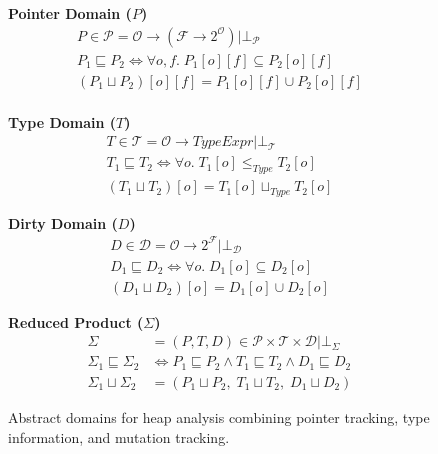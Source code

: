 
\begin{figure*}[t]
\centering

\begin{minipage}[t]{0.32\textwidth}
\centering
\textbf{Pointer Domain ($P$)}
\begin{gather*}
P \in \mathcal{P} = \mathcal{O} \to (\mathcal{F} \to 2^{\mathcal{O}}) | \bot_\mathcal{P} \\[0.3em]
P_1 \sqsubseteq P_2 \iff \forall o,f.\; P_1[o][f] \subseteq P_2[o][f] \\[0.3em]
(P_1 \sqcup P_2)[o][f] = P_1[o][f] \cup P_2[o][f] \\
\end{gather*}
\end{minipage}%
\hfill
\begin{minipage}[t]{0.32\textwidth}
\centering
\textbf{Type Domain ($T$)}
\begin{gather*}
T \in \mathcal{T} = \mathcal{O} \to \mathit{TypeExpr} | \bot_\mathcal{T} \\[0.3em]
T_1 \sqsubseteq T_2 \iff \forall o.\; T_1[o] \leq_{\mathit{Type}} T_2[o] \\[0.3em]
(T_1 \sqcup T_2)[o] = T_1[o] \sqcup_{\mathit{Type}} T_2[o]
\end{gather*}
\end{minipage}%
\hfill
\begin{minipage}[t]{0.32\textwidth}
\centering
\textbf{Dirty Domain ($D$)}
\begin{gather*}
D \in \mathcal{D} = \mathcal{O} \to 2^{\mathcal{F}} | \bot_\mathcal{D} \\[0.3em]
D_1 \sqsubseteq D_2 \iff \forall o.\; D_1[o] \subseteq D_2[o] \\[0.3em]
(D_1 \sqcup D_2)[o] = D_1[o] \cup D_2[o]
\end{gather*}
\end{minipage}

\vspace{1.5em}

\noindent\textbf{Reduced Product ($\Sigma$)}
\begin{align*}
\Sigma &= (P,T,D) \in \mathcal{P} \times \mathcal{T} \times \mathcal{D} | \bot_\mathcal{\Sigma}\\[0.3em]
\Sigma_1 \sqsubseteq \Sigma_2 &\iff P_1 \sqsubseteq P_2 \land T_1 \sqsubseteq T_2 \land D_1 \sqsubseteq D_2 \\[0.3em]
\Sigma_1 \sqcup \Sigma_2 &= (P_1 \sqcup P_2,\; T_1 \sqcup T_2,\; D_1 \sqcup D_2)
\end{align*}

\caption{Abstract domains for heap analysis combining pointer tracking, type information, and mutation tracking.}
\label{fig:abstract-domains}
\end{figure*}

